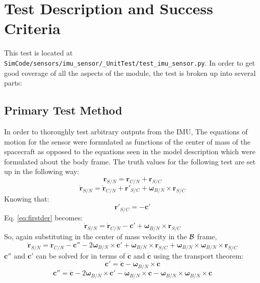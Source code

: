 \section{Test Description and Success Criteria}
This test is located at {\tt SimCode/sensors/imu\_sensor/\_UnitTest/test\_imu\_sensor.py}. In order to get good coverage of all the aspects of the module, the test is broken up into several parts: \par

\subsection{Primary Test Method}
In order to thoroughly test arbitrary outputs from the IMU, The equations of motion for the sensor were formulated as functions of the center of mass of the spacecraft as opposed to the equations seen in the model description which were formulated about the body frame. The truth values for the following test are set up in the following way:
\begin{equation}
{\bm{r}}_{S/N} = {\bm{r}}_{C/N} + {\bm{r}}_{S/C}
\end{equation}
\begin{equation}
\dot{{\bm{r}}}_{S/N} = \dot{{\bm{r}}}_{C/N} + {\bm{r}}'_{S/C} + \bm{\omega}_{B/N} \times {\bm{r}}_{S/C}
\label{eq:firstder}
\end{equation}
Knowing that:
\begin{equation}
{\bm{r}}'_{S/C} = - \bm{c}'
\end{equation}
Eq. \ref{eq:firstder} becomes:
\begin{equation}
	\dot{{\bm{r}}}_{S/N} = \dot{{\bm{r}}}_{C/N} - \bm{c}' + \bm{\omega}_{B/N} \times {\bm{r}}_{S/C}
	\label{eq:rdot}
\end{equation}
So, again substituting in the center of mass velocity in the $\cal{B}$ frame,
\begin{equation}
\ddot{{\bm{r}}}_{S/N} = \ddot{{\bm{r}}}_{C/N} - \bm{c}'' - 2\bm{\omega}_{B/N} \times \bm{c}'  + \dot{\bm{\omega}}_{B/N} \times {\bm{r}}_{S/C} + \bm{\omega}_{B/N} \times \bm{\omega}_{B/N} \times {\bm{r}}_{S/C}
\label{eq:SN}
\end{equation}
$ \bm{c}''$ and $ \bm{c}'$ can be solved for in terms of $\ddot{\bm{c}}$ and $\dot{\bm{c}}$ using the transport theorem:
\begin{equation}
\bm{c}'   = \dot{\bm{c}} - \bm{\omega}_{B/N} \times \bm{c}
\end{equation}
\begin{equation}
\bm{c}''  = \ddot{\bm{c}}  - 2\bm{\omega}_{B/N} \times \bm{c}' - \dot{\bm{\omega}}_{B/N} \times \bm{c}  -\bm{\omega}_{B/N} \times \bm{\omega}_{B/N} \times \bm{c}
\end{equation}
